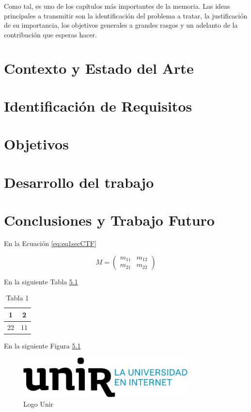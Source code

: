 \documentclass[11pt,a4paper,spanish]{book}
\numberwithin{equation}{chapter}
\numberwithin{figure}{chapter}
\begin{document}
Como tal, es uno de los capítulos más importantes de la memoria. Las ideas principales a transmitir son la identificación del problema a tratar, la justificación de su importancia, los objetivos generales a grandes rasgos y un adelanto de la contribución que esperas hacer.



\chapter{Contexto y Estado del Arte}

\chapter{Identificación de Requisitos}

\chapter{Objetivos}

\chapter{Desarrollo del trabajo}

\chapter{Conclusiones y Trabajo Futuro}

En la Ecuación \eqref{eq:eq1secCTF}


\begin{equation}\label{eq:eq1secCTF}
M=\begin{pmatrix}
	m_{11}&m_{12}\\
	m_{21}&m_{22}
\end{pmatrix}
\end{equation}

En la siguiente Tabla \ref{tab:tab1secCTF}

\begin{table}[h]
\centering
\begin{tabular}{|c|c|}
	\hline
	1 & 2 \\
	\hline
	22 & 11 \\
	\hline
\end{tabular}
\caption{Tabla 1}
\label{tab:tab1secCTF}
\end{table}

En la siguiente Figura \ref{fig:fig1secCTF}

\begin{figure}[h]
\includegraphics[width= 0.8\textwidth]{logo_unir}
\caption{Logo Unir}
\label{fig:fig1secCTF}
\end{figure}
\end{document}
